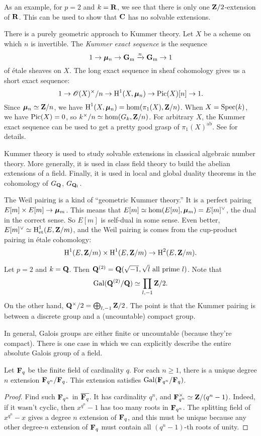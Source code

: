 As an example, for $p=2$ and $k=\mathbf{R}$, we see that there is only one 
$\mathbf{Z}/2$-extension of $\mathbf{R}$. This can be used to show that $\mathbf{C}$ has no solvable 
extensions. 

There is a purely geometric approach to Kummer theory. Let $X$ be a scheme 
on which $n$ is invertible. The \emph{Kummer exact sequence} is the sequence 
\[
  1 \to {\bm\mu}_n \to \mathbf{G}_\mathrm{m} \xrightarrow n \mathbf{G}_\mathrm{m} \to 1 
\]
of \'etale sheaves on $X$. The long exact sequence in sheaf cohomology gives 
us a short exact sequence: 
\[
  1 \to \mathscr{O}(X)^\times/n \to \operatorname{H}^1(X,{\bm\mu}_n) \to \operatorname{Pic}(X)[n] \to 1 .
\]
Since ${\bm\mu}_n\simeq \mathbf{Z}/n$, we have $\operatorname{H}^1(X,{\bm\mu}_n)=\hom(\pi_1(X),\mathbf{Z}/n)$. 
When $X=\operatorname{Spec}(k)$, we have $\operatorname{Pic}(X)=0$, so 
$k^\times/n\simeq \hom(G_k,\mathbf{Z}/n)$. For arbitrary $X$, the Kummer exact 
sequence can be used to get a pretty good grasp of $\pi_1(X)^\mathrm{ab}$. 
See \cite[5.8.3]{szamuely-2009} for details. 

Kummer theory is used to study solvable extensions in classical algebraic 
number theory. More generally, it is used in class field theory to build the 
abelian extensions of a field. Finally, it is used in local and global duality 
theorems in the cohomology of $G_{\mathbf{Q}}$, $G_{\mathbf{Q}_l}$. 

The Weil pairing is a kind of ``geometric Kummer theory.'' It is a perfect 
pairing $E[m]\times E[m]\to {\bm\mu}_m$. This means that 
$E[m]\simeq \hom(E[m],{\bm\mu}_m)=E[m]^\vee$, the dual in the correct sense. So 
$E[m]$ is self-dual in some sense. Even better, 
$E[m]^\vee\simeq \operatorname{H}^1_\mathrm{et}(E,\mathbf{Z}/m)$, and the Weil pairing is comes from 
the cup-product 
pairing in \'etale cohomology: 
\[
  \operatorname{H}^1(E,\mathbf{Z}/m)\times \operatorname{H}^1(E,\mathbf{Z}/m) \to \operatorname{H}^2(E,\mathbf{Z}/m).
\]

\begin{example}
Let $p=2$ and $k=\mathbf{Q}$. Then 
$\mathbf{Q}^{(2)}=\mathbf{Q}(\sqrt{-1},\sqrt{l}\text{ all prime }l)$. Note that 
\[
  \operatorname{Gal}(\mathbf{Q}^{(2)}/\mathbf{Q}) \simeq \prod_{l,-1} \mathbf{Z}/2 .
\]
On the other hand, $\mathbf{Q}^\times/2 = \bigoplus_{l,-1} \mathbf{Z}/2$. The point is that 
the Kummer pairing is between a discrete group and a (uncountable) compact 
group. 
\end{example}

In general, Galois groups are either finite or uncountable (because they're 
compact). There is one case in which we can explicitly describe the entire 
absolute Galois group of a field. 

\begin{theorem}
Let $\mathbf{F}_q$ be the finite field of cardinality $q$. For each $n\geqslant 1$, 
there is a unique degree $n$ extension $\mathbf{F}_{q^n}/\mathbf{F}_q$. This extension satisfies 
$\operatorname{Gal}(\mathbf{F}_{q^n}/\mathbf{F}_q)$. 
\end{theorem}
\begin{proof}
Find such $\mathbf{F}_{q^n}$ in $\overline{\mathbf{F}_q}$. It has cardinality $q^n$, and 
$\mathbf{F}_{q^n}^\times\simeq \mathbf{Z}/(q^n-1)$. Indeed, if it wasn't cyclic, then 
$x^{q^n}-1$ has too many roots in $\mathbf{F}_{q^n}$. The splitting field of 
$x^{q^n}-x$ gives a degree $n$ extension of $\mathbf{F}_q$, and this must be unique 
because any other degree-$n$ extension of $\mathbf{F}_q$ must contain all 
$(q^n-1)$-th roots of unity. 
\end{proof}





